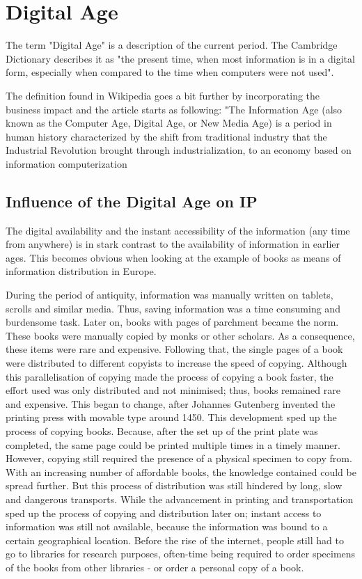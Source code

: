 \documentclass[a4paper]{report}
\begin{document}
\section{Digital Age}
\label{sec:Digital age}
The term "Digital Age" is a description of the current period. The Cambridge Dictionary describes it as "the present time, when most information is in a digital form, especially when compared to the time when computers were not used". \parencite{CambridgeUniversityPress2014}

The definition found in Wikipedia goes a bit further by incorporating the business impact and the article starts as following: "The Information Age (also known as the Computer Age, Digital Age, or New Media Age) is a period in human history characterized by the shift from traditional industry that the Industrial Revolution brought through industrialization, to an economy based on information computerization \parencite{WikiInfoAge2017}

\subsection{Influence of the Digital Age on IP}
The digital availability and the instant accessibility of the information (any time from anywhere) is in stark contrast to the availability of information in earlier ages. This becomes obvious when looking at the example of books as means of information distribution in Europe.

During the period of antiquity, information was manually written on tablets, scrolls and similar media. Thus, saving information was a time consuming and burdensome task.  Later on, books with pages of parchment became the norm. These books were manually copied by monks or other scholars. As a consequence, these items were rare and expensive. Following that, the single pages of a book were distributed to different copyists to increase the speed of copying. Although this parallelisation of copying made the process of copying a book faster, the effort used was only distributed and not minimised; thus, books remained rare and expensive. This began to change, after Johannes Gutenberg invented the printing press with movable type around 1450. This development sped up the process of copying books. Because, after the set up of the print plate was completed, the same page could be printed multiple times in a timely manner. However, copying still required the presence of a physical specimen to copy from. With an increasing number of affordable books, the knowledge contained could be spread further. But this process of distribution was still hindered by long, slow and dangerous transports. While the advancement in printing and transportation sped up the process of copying and distribution later on; instant access to information was still not available, because the information was bound to a certain geographical location. Before the rise of the internet, people still had to go to libraries for research purposes, often-time being required to order specimens of the books from other libraries - or order a personal copy of a book.
\end{document}
